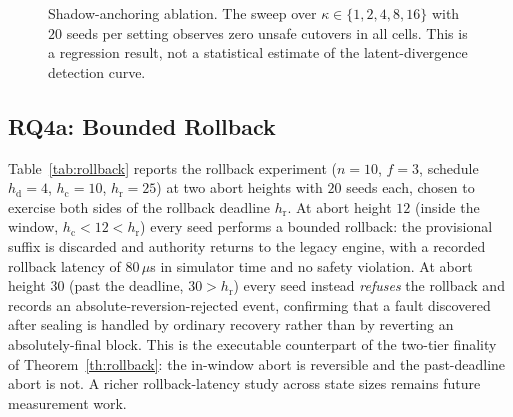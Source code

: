 \documentclass[journal]{IEEEtran}
\theoremstyle{definition}
\theoremstyle{remark}
\begin{document}
\begin{figure}[t]
\centering
{}
\caption{Shadow-anchoring ablation. The sweep over
$\kappa\in\{1,2,4,8,16\}$ with $20$ seeds per setting observes zero unsafe cutovers in all
cells. This is a regression result, not a statistical estimate of the
latent-divergence detection curve.}
\label{fig:ablation}
\end{figure}

\subsection{RQ4a: Bounded Rollback}
Table~\ref{tab:rollback} reports the rollback experiment ($n{=}10$, $f{=}3$,
schedule $h_{\mathrm{d}}{=}4$, $h_{\mathrm{c}}{=}10$, $h_{\mathrm{r}}{=}25$) at two abort heights
with $20$ seeds each, chosen to exercise both sides of the rollback deadline $h_{\mathrm{r}}$. At
abort height $12$ (inside the window, $h_{\mathrm{c}}{<}12{<}h_{\mathrm{r}}$) every seed performs
a bounded rollback: the provisional suffix is discarded and authority returns to the legacy
engine, with a recorded rollback latency of $80\,\mu$s in simulator time and no safety violation.
At abort height $30$ (past the deadline, $30{>}h_{\mathrm{r}}$) every seed instead \emph{refuses}
the rollback and records an absolute-reversion-rejected event, confirming that a fault discovered
after sealing is handled by ordinary recovery rather than by reverting an absolutely-final block.
This is the executable counterpart of the two-tier finality of Theorem~\ref{th:rollback}: the
in-window abort is reversible and the past-deadline abort is not. A richer rollback-latency study
across state sizes remains future measurement work.
\end{document}
